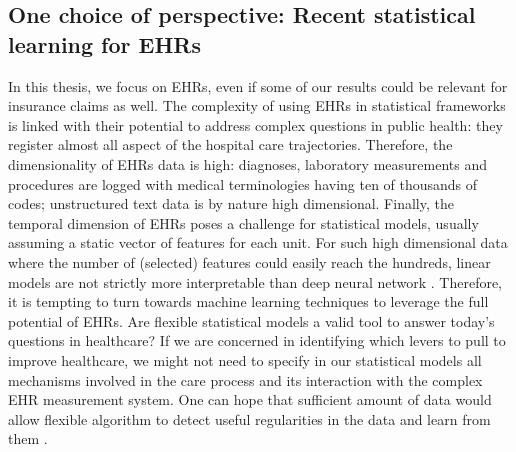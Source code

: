 \documentclass[french,12pt,twoside,a4paper]{book}
\begin{document}
\begin{background_box_left}


\end{background_box_left}


\subsection{One choice of perspective: Recent statistical learning for EHRs}%
\label{subsec:intro:focus_data}%

In this thesis, we focus on EHRs, even if some of our results could be relevant
for insurance claims as well. The complexity of using EHRs in statistical
frameworks is linked with their potential to address complex questions in public
health: they register almost all aspect of the hospital care trajectories.
Therefore, the dimensionality of EHRs data is high: diagnoses, laboratory
measurements and procedures are logged with medical terminologies having ten of
thousands of codes; unstructured text data is by nature high dimensional.
Finally, the temporal dimension of EHRs poses a challenge for statistical
models, usually assuming a static vector of features for each unit.
For such high dimensional data where the number of (selected) features could
easily reach the hundreds, linear models are not strictly more interpretable
than deep neural network \citep{lipton2018mythos}. Therefore, it is tempting to
turn towards machine learning techniques to leverage the full potential of EHRs.
% 
Are flexible statistical models a valid tool to answer today's questions in
healthcare? If we are concerned in identifying which levers to pull to improve
healthcare, we might not need to specify in our statistical models all
mechanisms involved in the care process and its interaction with the complex EHR
measurement system. One can hope that sufficient amount of data would allow flexible algorithm to
detect useful regularities in the data and learn from them
\citep{halevy2009unreasonable}.
\end{document}

